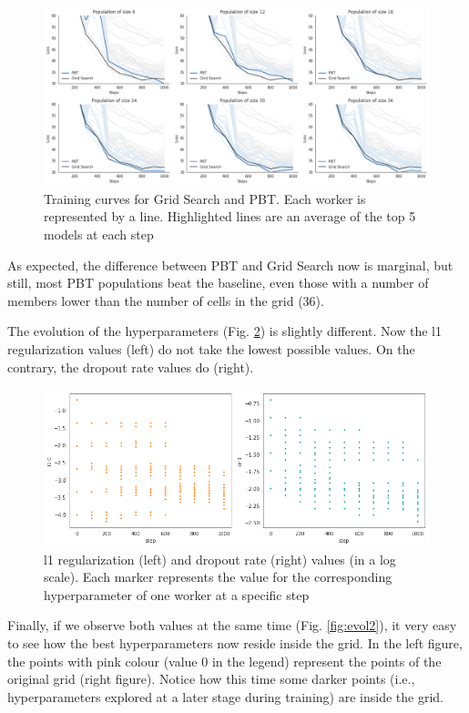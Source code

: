 \documentclass{article}
\begin{document}
\begin{figure}[H]
    \label{fig:training-curves2}
    \centering
    \includegraphics[width=\textwidth,height=\textheight,keepaspectratio]{training_curves2}
    \caption{Training curves for Grid Search and PBT. Each worker is represented by a line. Highlighted lines are an average of the top 5 models at each step}
\end{figure}

As expected, the difference between PBT and Grid Search now is marginal, but still, most PBT populations beat the baseline, even those with a number of members lower than the number of cells in the grid (36).

The evolution of the hyperparameters (Fig. \ref{fig:hyp2}) is slightly different. Now the l1 regularization values (left) do not take the lowest possible values. On the contrary, the dropout rate values do (right).

\begin{figure}[H]
    \label{fig:hyp2}
    \centering
    \includegraphics[width=\textwidth,height=\textheight,keepaspectratio]{hyperparameters_population2.png}
    \caption{l1 regularization (left) and dropout rate (right) values (in a log scale). Each marker represents the value for the corresponding hyperparameter of one worker at a specific step}
\end{figure}

Finally, if we observe both values at the same time (Fig. \ref{fig:evol2}), it very easy to see how the best hyperparameters now reside inside the grid. In the left figure, the points with pink colour (value 0 in the legend) represent the points of the original grid (right figure). Notice how this time some darker points (i.e., hyperparameters explored at a later stage during training) are inside the grid.
\end{document}
